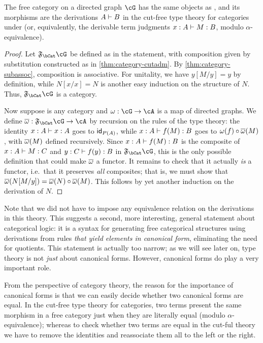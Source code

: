 \begin{thm}\label{thm:category-initial-2}
  The free category on a directed graph $\cG$ has the same objects as \cG, and its morphisms are the derivations $A\vdash B$ in the cut-free type theory for categories under \cG (or, equivalently, the derivable term judgments $x:A \vdash M:B$, modulo $\alpha$-equivalence).
\end{thm}
\begin{proof}
  Let $\F\bCat\cG$ be defined as in the statement, with composition given by substitution constructed as in \cref{thm:category-cutadm}.
  By \cref{thm:category-subassoc}, composition is associative.
  For unitality, we have $y[M/y] = y$ by definition, while $N[x/x] = N$ is another easy induction on the structure of $N$.
  Thus, $\F\bCat\cG$ is a category.

  Now suppose \cA is any category and $\pfree:\cG\to\cA$ is a map of directed graphs.
  We define $\free:\F\bCat\cG \to\cA$ by recursion on the rules of the type theory: the identity $x:A\vdash x:A$ goes to $\mathsf{id}_{P(A)}$, while $x:A\vdash f(M):B$ goes to $\omega(f) \circ \overline{\omega}(M)$, with $\overline{\omega}(M)$ defined recursively.
  Since $x:A\vdash f(M):B$ is the composite of $x:A\vdash M:C$ and $y:C\vdash f(y):B$ in $\F\bCat\cG$, this is the only possible definition that could make $\overline{\omega}$ a functor.
  It remains to check that it actually \emph{is} a functor, i.e.\ that it preserves \emph{all} composites; that is, we must show that $\overline{\omega}(N[M/y]) = \overline{\omega}(N) \circ \overline{\omega}(M)$.
  This follows by yet another induction on the derivation of $N$.
\end{proof}

Note that we did not have to impose any equivalence relation on the derivations in this theory.
This suggests a second, more interesting, general statement about categorical logic: it is
{a syntax for generating free categorical structures using derivations from rules}
\emph{that yield elements in canonical form}, eliminating the need for quotients.
This statement is actually too narrow; as we will see later on, type theory is not \emph{just} about canonical forms.
However, canonical forms do play a very important role.

From the perspective of category theory, the reason for the importance of canonical forms is that we can easily decide whether two canonical forms are equal.
In the cut-free type theory for categories, two terms present the same morphism in a free category just when they are literally equal (modulo $\alpha$-equivalence); whereas to check whether two terms are equal in the cut-ful theory we have to remove the identities and reassociate them all to the left or the right.

